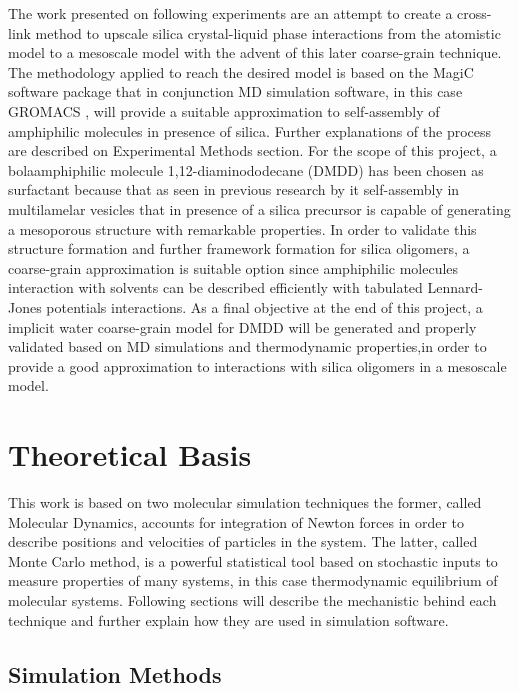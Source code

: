 \documentclass[10pt,a4paper,twoside]{article}
\begin{document}
The work presented on following experiments are an attempt to create a cross-link method to upscale silica crystal-liquid phase interactions \cite{silica1} from the atomistic model to a mesoscale model with the advent of this later coarse-grain technique. The methodology applied to reach the desired model is based on the MagiC software package \cite{magic} that in conjunction MD simulation software, in this case GROMACS \cite{gromacs}, will provide a suitable approximation to self-assembly of amphiphilic molecules in presence of silica. Further explanations of the process are described on Experimental Methods section. For the scope of this project, a bolaamphiphilic molecule 1,12-diaminododecane (DMDD) has been chosen as surfactant because that as seen in previous research by  it self-assembly in multilamelar vesicles that in presence of a silica precursor is capable of generating a mesoporous structure with remarkable properties. In order to validate this structure formation and further framework formation for silica oligomers, a coarse-grain approximation is suitable option since amphiphilic molecules interaction with solvents can be described efficiently with tabulated Lennard-Jones potentials interactions. As a final objective at the end of this project, a implicit water coarse-grain model for DMDD will be generated and properly validated based on MD simulations and thermodynamic properties,in order to provide a good approximation to interactions with silica oligomers in a mesoscale model. 
\section{Theoretical Basis}
This work is based on two molecular simulation techniques the former, called Molecular Dynamics, accounts for integration of Newton forces in order to describe positions and velocities of particles in the system. The latter, called Monte Carlo method, is a powerful statistical tool based on stochastic inputs to measure properties of many systems, in this case thermodynamic equilibrium of molecular systems. Following sections will describe the mechanistic behind each technique and further explain how they are used in simulation software.
\subsection{Simulation Methods}
\end{document}
